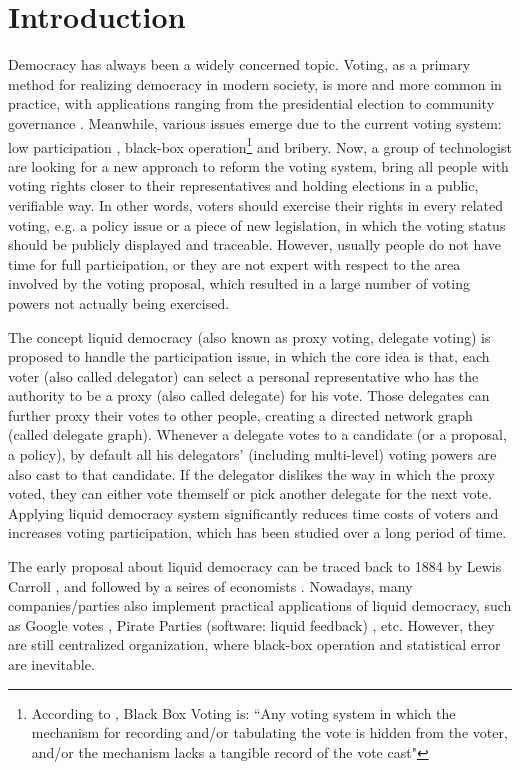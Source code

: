 \section{Introduction}
Democracy has always been a widely concerned topic. Voting, as a primary method for realizing democracy in modern society, is more and more common in practice, with applications ranging from the presidential election to community governance \cite{gerber1998primary,kohno2004analysis}. Meanwhile, various issues emerge due to the current voting system: low participation \cite{birch2016full,kousser2007does}, black-box operation\cite{bannet2004hack,harris2004black}\footnote{According to \cite{harris2004black}, Black Box Voting is: ``Any voting system in which the mechanism for recording and/or tabulating the vote is hidden from the voter, and/or the mechanism lacks a tangible record of the vote cast"} and bribery. Now, a group of technologist are looking for a new approach to reform the voting system, bring all people with voting rights closer to their representatives and holding elections in a public, verifiable way. In other words, voters should exercise their rights in every related voting, e.g. a policy issue or a piece of new legislation, in which the voting status should be publicly displayed and traceable. However, usually people do not have time for full participation, or they are not expert with respect to the area involved by the voting proposal, which resulted in a large number of voting powers not actually being exercised.

The concept liquid democracy (also known as proxy voting, delegate voting) is proposed to handle the participation issue, in which the core idea is that, each voter (also called delegator) can select a personal representative who has the authority to be a proxy (also called delegate) for his vote.  Those delegates can further proxy their votes to other people, creating a directed network graph (called delegate graph). Whenever a delegate votes to a candidate (or a proposal, a policy), by default all his delegators' (including multi-level) voting powers are also cast to that candidate. If the delegator dislikes the way in which the proxy voted, they can either vote themself or pick another delegate for the next vote. Applying liquid democracy system significantly reduces time costs of voters and increases voting participation, which has been studied over a long period of time.

The early proposal about liquid democracy can be traced back to 1884 by Lewis Carroll \cite{carroll1884principles}, and followed by a seires of economists \cite{william1912primary,miller1969program,paulin2014through}. Nowadays, many companies/parties also implement practical applications of liquid democracy, such as Google votes \cite{hardt2015google}, Pirate Parties (software: liquid feedback) \cite{behrens2014principles}, etc. However, they are still centralized organization, where black-box operation and statistical error are inevitable.


